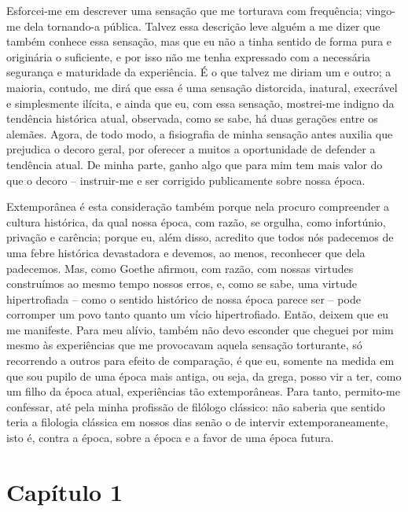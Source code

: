 Esforcei-me em descrever uma sensação que me torturava com frequência;
vingo-me dela tornando-a pública. Talvez essa descrição leve alguém a me
dizer que também conhece essa sensação, mas que eu não a tinha sentido
de forma pura e originária o suficiente, e por isso não me tenha
expressado com a necessária segurança e maturidade da experiência. É o
que talvez me diriam um e outro; a maioria, contudo, me dirá que essa é
uma sensação distorcida, inatural, execrável e simplesmente ilícita, e
ainda que eu, com essa sensação, mostrei-me indigno da tendência
histórica atual, observada, como se sabe, há duas gerações entre os
alemães. Agora, de todo modo, a fisiografia de minha sensação antes
auxilia que prejudica o decoro geral, por oferecer a muitos a
oportunidade de defender a tendência atual. De minha parte, ganho algo
que para mim tem mais valor do que o decoro -- instruir-me e ser
corrigido publicamente sobre nossa época.

Extemporânea é esta consideração também porque nela procuro compreender
a cultura histórica, da qual nossa época, com razão, se orgulha, como
infortúnio, privação e carência; porque eu, além disso, acredito que
todos nós padecemos de uma febre histórica devastadora e devemos, ao
menos, reconhecer que dela padecemos. Mas, como Goethe afirmou, com
razão, com nossas virtudes construímos ao mesmo tempo nossos erros,
e, como se sabe, uma virtude hipertrofiada -- como o sentido histórico
de nossa época parece ser -- pode corromper um povo tanto quanto um
vício hipertrofiado. Então, deixem que eu me manifeste. Para meu alívio,
também não devo esconder que cheguei por mim mesmo às experiências que
me provocavam aquela sensação torturante, só recorrendo a outros para
efeito de comparação, é que eu, somente na medida em que sou pupilo de
uma época mais antiga, ou seja, da grega, posso vir a ter, como um filho
da época atual, experiências tão extemporâneas. Para tanto, permito-me
confessar, até pela minha profissão de filólogo clássico: não saberia
que sentido teria a filologia clássica em nossos dias senão o de
intervir extemporaneamente, isto é, contra a época, sobre a época e a
favor de uma época futura.

\chapter{Capítulo 1}

